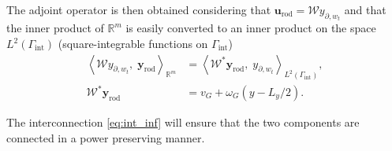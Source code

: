 The adjoint operator is then obtained considering that $\mathbf{u}_{\text{rod}} = \mathcal{W} y_{\partial, w_t}$ and that the inner product of $\mathbb{R}^m$ is easily converted to an inner product on the space $L^2(\Gamma_{\text{int}})$ (square-integrable functions on $\Gamma_{\text{int}}$)
\begin{align*}
\left\langle \mathcal{W} y_{\partial, w_t}, \; \mathbf{y}_{\text{rod}} \right\rangle_{\mathbb{R}^m} &= \left\langle \mathcal{W}^* \mathbf{y}_{\text{rod}} , \; y_{\partial, w_t} \right\rangle_{L^2(\Gamma_{\text{int}})}, \\
\mathcal{W}^* \mathbf{y}_{\text{rod}} &= v_G + \omega_{G} \left( y - L_y/2 \right).
\end{align*}

The interconnection \eqref{eq:int_inf} will ensure that the two components are connected in a power preserving manner.

